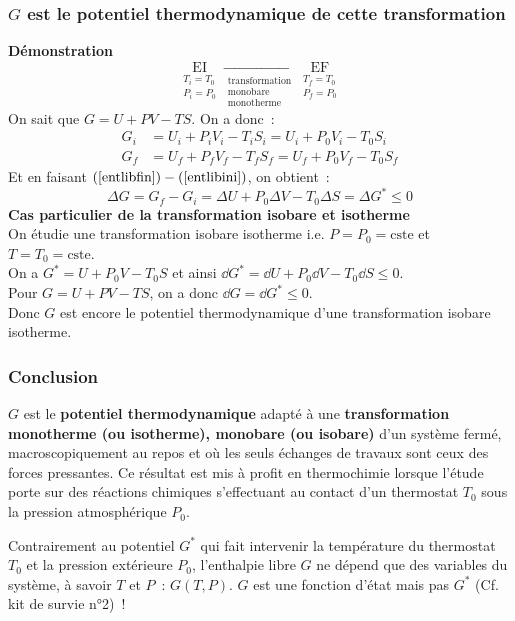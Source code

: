 \documentclass{article}
\let\oldref\ref
\renewcommand{\ref}[1]{(\oldref{#1})}
\newcommand{\cste}{\text{cste}}
\newcommand{\EI}{\mathrm{EI}}
\newcommand{\EF}{\mathrm{EF}}
\begin{document}
\subsubsection{$G$ est le potentiel thermodynamique de cette transformation}
\begin{tableau}
    \textbf{Démonstration}
    $$\underset{\substack{T_i=T_0\\P_i=P_0}}{\EI} \xrightarrow[\substack{\text{transformation}\\\text{monobare}\\\text{monotherme}}]{} \underset{\substack{T_f=T_0\\P_f=P_0}}{\EF}$$
    On sait que $G = U + PV - TS$. On a donc~:
    \begin{align}
        G_i &= U_i + P_iV_i - T_iS_i = U_i + P_0V_i - T_0S_i \label{entlibini}\\
        G_f &= U_f + P_fV_f - T_fS_f = U_f + P_0V_f - T_0S_f \label{entlibfin}
    \end{align}
    Et en faisant $\ref{entlibfin}-\ref{entlibini}$, on obtient~:
    \begin{equation}\label{difentlib}
        \Delta G = G_f-G_i = \Delta U + P_0\Delta V - T_0\Delta S = \Delta G^* \leq 0  
    \end{equation}
    \tcbline
    \textbf{Cas particulier de la transformation isobare et isotherme}\\
    On étudie une transformation isobare isotherme i.e. $P = P_0 = \cste$ et $T = T_0 = \cste$.\\
    On a $G^* = U+P_0V - T_0S$ et ainsi $\dd{G^*} = \dd{U} + P_0\dd{V} - T_0\dd{S} \leq 0$.\\
    Pour $G = U+ PV - TS$, on a donc $\dd{G} = \dd{G^*} \leq 0$.\\
    
    Donc $G$ est encore le potentiel thermodynamique d'une transformation isobare isotherme.
\end{tableau}

\subsubsection{Conclusion}
\begin{important}
    $G$ est le \textbf{potentiel thermodynamique} adapté à une \textbf{transformation monotherme (ou isotherme), monobare (ou isobare)} d'un système fermé, macroscopiquement au repos et où les seuls échanges de travaux sont ceux des forces pressantes. Ce résultat est mis à profit en thermochimie lorsque l'étude porte sur des réactions chimiques\footnotemark{} s'effectuant au contact d'un thermostat $T_0$ sous la pression atmosphérique $P_0$.
\end{important}
\begin{remarque}[Remarque]
    Contrairement au potentiel $G^*$ qui fait intervenir la température du thermostat $T_0$ et la pression extérieure $P_0$,  l'enthalpie libre $G$ ne dépend que des variables du système, à savoir $T$ et $P$~: $G(T, P)$. $G$ est une fonction d'état mais pas $G^*$ (Cf. kit de survie n°2)~!
\end{remarque}
\end{document}
